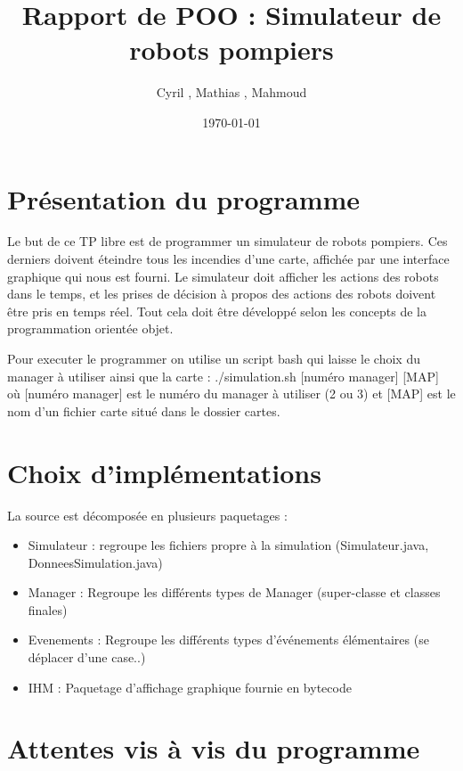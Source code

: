 \documentclass[a4paper,11pt]{article}
\title{Rapport de POO : Simulateur de robots pompiers}
\author{Cyril \bsc{Dutrieux}, Mathias \bsc{Biehler},  Mahmoud \bsc{Bentriou}}
\date{\today}
\begin{document}

\maketitle

\tableofcontents

\section{Présentation du programme}

Le but de ce TP libre est de programmer un simulateur de robots pompiers. Ces derniers doivent éteindre tous les incendies d'une carte, affichée par une interface graphique qui nous est fourni. Le simulateur doit afficher les actions des robots dans le temps, et les prises de décision à propos des actions des robots doivent être pris en temps réel. Tout cela doit être développé selon les concepts de la programmation orientée objet.

Pour executer le programmer on utilise un script bash qui laisse le choix du manager à utiliser ainsi que la carte :
./simulation.sh [numéro manager] [MAP] 
où [numéro manager] est le numéro du manager à utiliser (2 ou 3) et [MAP] est le nom d'un fichier carte situé dans le dossier cartes.

\section{Choix d'implémentations}

La source est décomposée en plusieurs paquetages :
\begin{itemize}
\item Simulateur : regroupe les fichiers propre à la simulation (Simulateur.java, DonneesSimulation.java)
\item Manager : Regroupe les différents types de Manager (super-classe et classes finales)
\item Evenements : Regroupe les différents types d'événements élémentaires (se déplacer d'une case..)
\item IHM : Paquetage d'affichage graphique fournie en bytecode
\end{itemize}

\section{Attentes vis à vis du programme}

\end{document}
